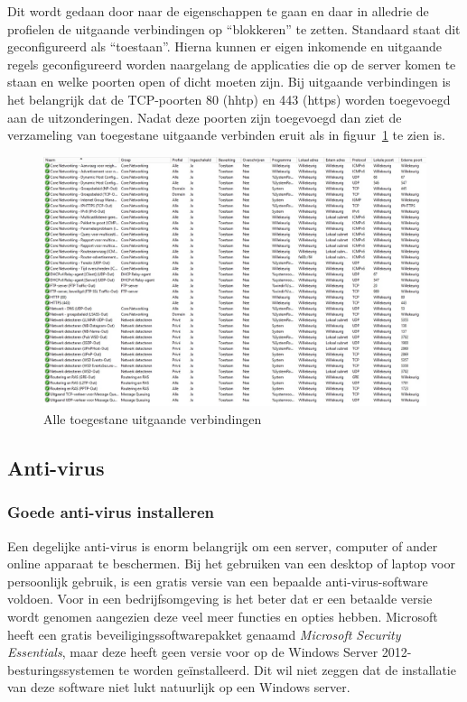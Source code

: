\documentclass[pdftex,a4paper,12pt]{report}
\begin{document}
Dit wordt gedaan door naar de eigenschappen te gaan en daar in alledrie de profielen de uitgaande verbindingen op "`blokkeren"' te zetten. Standaard staat dit geconfigureerd als "`toestaan"'. Hierna kunnen er eigen inkomende en uitgaande regels geconfigureerd worden naargelang de applicaties die op de server komen te staan en welke poorten open of dicht moeten zijn. Bij uitgaande verbindingen is het belangrijk dat de TCP-poorten 80 (hhtp) en 443 (https) worden toegevoegd aan de uitzonderingen. Nadat deze poorten zijn toegevoegd dan ziet de verzameling van toegestane uitgaande verbinden eruit als in figuur~\ref{img:FirewallUitgaand} te zien is.

\begin{figure}[H]
\begin{center}
\includegraphics[scale=0.45]{img/FirewallUitgaand}
\end{center}
\caption{Alle toegestane uitgaande verbindingen}
\label{img:FirewallUitgaand}
\end{figure}

\subsection{Anti-virus}
\subsubsection{Goede anti-virus installeren}
Een degelijke anti-virus is enorm belangrijk om een server, computer of ander online apparaat te beschermen. Bij het gebruiken van een desktop of laptop voor persoonlijk gebruik, is een gratis versie van een bepaalde anti-virus-software voldoen. Voor in een bedrijfsomgeving is het beter dat er een betaalde versie wordt genomen aangezien deze veel meer functies en opties hebben. Microsoft heeft een gratis beveiligingssoftwarepakket genaamd \textit{Microsoft Security Essentials}, maar deze heeft geen versie voor op de Windows Server 2012-besturingssystemen te worden geïnstalleerd. Dit wil niet zeggen dat de installatie van deze software niet lukt natuurlijk op een Windows server.
\end{document}
